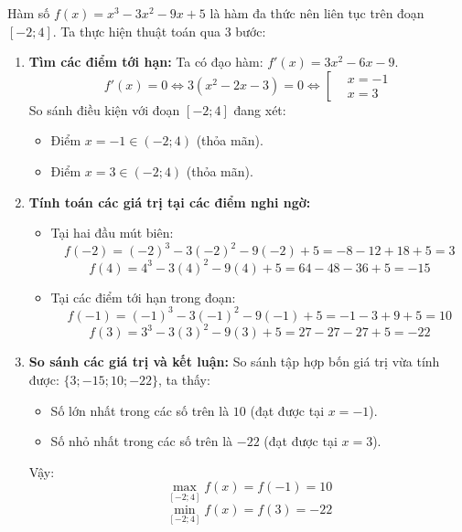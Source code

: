 \documentclass[12pt]{article}
\begin{document}
	\begin{loigiai}
		Hàm số $f(x) = x^3 - 3x^2 - 9x + 5$ là hàm đa thức nên liên tục trên đoạn $[-2; 4]$. Ta thực hiện thuật toán qua 3 bước:
		
		\begin{enumerate}[label=\textbf{B\arabic*.}]
			\item \textbf{Tìm các điểm tới hạn:}
			Ta có đạo hàm: $f'(x) = 3x^2 - 6x - 9$.
			$$f'(x) = 0 \iff 3(x^2 - 2x - 3) = 0 \iff \left[\begin{aligned} &x = -1 \\ &x = 3 \end{aligned}\right.$$
			So sánh điều kiện với đoạn $[-2; 4]$ đang xét:
			\begin{itemize}
				\item Điểm $x = -1 \in (-2; 4)$ (thỏa mãn).
				\item Điểm $x = 3 \in (-2; 4)$ (thỏa mãn).
			\end{itemize}
			
			\item \textbf{Tính toán các giá trị tại các điểm nghi ngờ:}
			\begin{itemize}
				\item Tại hai đầu mút biên:
				$$f(-2) = (-2)^3 - 3(-2)^2 - 9(-2) + 5 = -8 - 12 + 18 + 5 = 3$$
				$$f(4) = 4^3 - 3(4)^2 - 9(4) + 5 = 64 - 48 - 36 + 5 = -15$$
				\item Tại các điểm tới hạn trong đoạn:
				$$f(-1) = (-1)^3 - 3(-1)^2 - 9(-1) + 5 = -1 - 3 + 9 + 5 = 10$$
				$$f(3) = 3^3 - 3(3)^2 - 9(3) + 5 = 27 - 27 - 27 + 5 = -22$$
			\end{itemize}
			
			\item \textbf{So sánh các giá trị và kết luận:}
			So sánh tập hợp bốn giá trị vừa tính được: $\{3; -15; 10; -22\}$, ta thấy:
			\begin{itemize}
				\item Số lớn nhất trong các số trên là $10$ (đạt được tại $x = -1$).
				\item Số nhỏ nhất trong các số trên là $-22$ (đạt được tại $x = 3$).
			\end{itemize}
			Vậy:
			$$\max_{[-2; 4]} f(x) = f(-1) = 10$$
			$$\min_{[-2; 4]} f(x) = f(3) = -22$$
		\end{enumerate}
	\end{loigiai}
	
	
	\newpage
	
\end{document}
